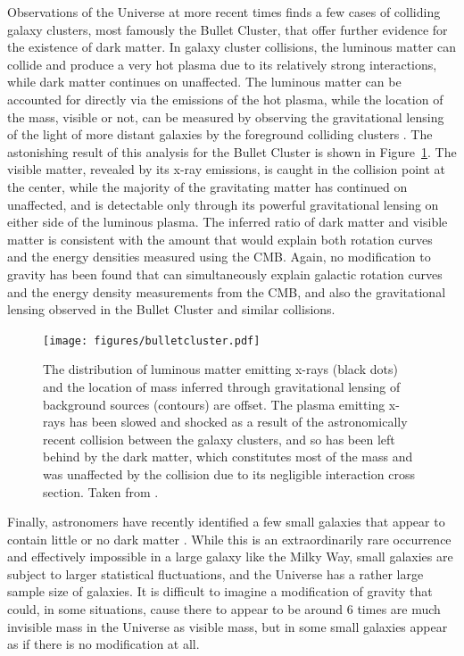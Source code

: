   Observations of the Universe at more recent times finds a few cases of colliding galaxy clusters, most famously the Bullet Cluster, that offer further evidence for the existence of dark matter.
  In galaxy cluster collisions, the luminous matter can collide and produce a very hot plasma due to its relatively strong interactions, while dark matter continues on unaffected.
  The luminous matter can be accounted for directly via the emissions of the hot plasma, while the location of the mass, visible or not, can be measured by observing the gravitational lensing of the light of more distant galaxies by the foreground colliding clusters \cite{bulletcluster}.
  The astonishing result of this analysis for the Bullet Cluster is shown in Figure~\ref{fig:bulletcluster}.
  The visible matter, revealed by its x-ray emissions, is caught in the collision point at the center, while the majority of the gravitating matter has continued on unaffected, and is detectable only through its powerful gravitational lensing on either side of the luminous plasma.
  The inferred ratio of dark matter and visible matter is consistent with the amount that would explain both rotation curves and the energy densities measured using the CMB.
  Again, no modification to gravity has been found that can simultaneously explain galactic rotation curves and the energy density measurements from the CMB, and also the gravitational lensing observed in the Bullet Cluster and similar collisions.
  \begin{figure}[h!]
    \centering
    \texttt{[image: figures/bulletcluster.pdf]}
    \caption[Mass and x-ray distributions of the Bullet Cluster.]{
      The distribution of luminous matter emitting x-rays (black dots) and the location of mass inferred through gravitational lensing of background sources (contours) are offset.
      The plasma emitting x-rays has been slowed and shocked as a result of the astronomically recent collision between the galaxy clusters, and so has been left behind by the dark matter, which constitutes most of the mass and was unaffected by the collision due to its negligible interaction cross section.
      Taken from \cite{bulletcluster}.}
    \label{fig:bulletcluster}
  \end{figure}  

  Finally, astronomers have recently identified a few small galaxies that appear to contain little or no dark matter \cite{zeroDMgalaxy}.
  While this is an extraordinarily rare occurrence and effectively impossible in a large galaxy like the Milky Way, small galaxies are subject to larger statistical fluctuations, and the Universe has a rather large sample size of galaxies.
  It is difficult to imagine a modification of gravity that could, in some situations, cause there to appear to be around 6 times are much invisible mass in the Universe as visible mass, but in some small galaxies appear as if there is no modification at all.

